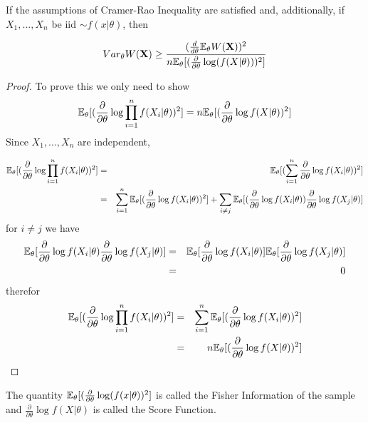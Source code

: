 \documentclass[a4paper,english,12pt]{article}
\newcommand{\bX}{\mathbf{X}}
\begin{document}
\begin{cor}
If the assumptions of Cramer-Rao Inequality are satisfied and, additionally, if $X_1, ... , X_n$ be iid $\sim f(x|\theta)$, then

\begin{equation}
Var_{\theta} W(\bX) \geq \frac{(\frac{d}{d\theta} \E_{\theta}W(\bX))^2}{n\E_{\theta}[(\frac{\partial}{\partial\theta} \log (f(X|\theta)))^2]}
\end{equation}

\begin{proof}
To prove this we only need to show
\begin{equation}
\mathbb{E}_\theta[(\frac{\partial}{\partial\theta} \log \prod_{i=1}^{n} f(X_i|\theta))^2] = n\mathbb{E}_\theta[(\frac{\partial}{\partial\theta} \log f(X|\theta))^2]
\end{equation}
Since $X_1, ... , X_n$ are independent,

\begin{eqnarray*}
\mathbb{E}_\theta[(\frac{\partial}{\partial\theta} \log \prod_{i=1}^{n} f(X_i|\theta))^2] &=& \mathbb{E}_\theta[(\sum_{i=1}^{n}\frac{\partial}{\partial\theta} \log  f(X_i|\theta))^2] \\
&=& \sum_{i=1}^{n}\mathbb{E}_\theta[(\frac{\partial}{\partial\theta} \log  f(X_i|\theta))^2] + \sum_{i \neq j}\mathbb{E}_\theta[(\frac{\partial}{\partial\theta} \log  f(X_i|\theta))\frac{\partial}{\partial\theta} \log  f(X_j|\theta)]
\end{eqnarray*}
for $i\neq j$ we have
\begin{eqnarray*}
\mathbb{E}_\theta[\frac{\partial}{\partial\theta} \log  f(X_i|\theta)\frac{\partial}{\partial\theta} \log  f(X_j|\theta)] &=& \mathbb{E}_\theta[\frac{\partial}{\partial\theta} \log  f(X_i|\theta)]\mathbb{E}_\theta[\frac{\partial}{\partial\theta} \log  f(X_j|\theta)] \\
&=& 0
\end{eqnarray*}
therefor
\begin{eqnarray*}
\mathbb{E}_\theta[(\frac{\partial}{\partial\theta} \log \prod_{i=1}^{n} f(X_i|\theta))^2] &=& \sum_{i=1}^{n}\mathbb{E}_\theta[(\frac{\partial}{\partial\theta} \log  f(X_i|\theta))^2] \\
&=& n\mathbb{E}_\theta[(\frac{\partial}{\partial\theta} \log f(X|\theta))^2]
\end{eqnarray*}

\end{proof}
\end{cor}

The quantity $\mathbb{E}_\theta[(\frac{\partial}{\partial\theta} \log(f(x|\theta))^2]$ is called the Fisher Information of the sample and $\frac{\partial}{\partial\theta} \log f(X|\theta)$ is called the Score Function.
\end{document}
